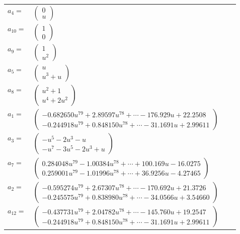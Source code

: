 \documentclass[1p]{elsarticle_modified}
\theoremstyle{definition}
\begin{document}
\begin{tabular}{m{7pt} m{180pt} m{7pt} m{180pt} }
\flushright $a_{4}=$&$\begin{pmatrix}0\\u\end{pmatrix}$ \\
\flushright $a_{10}=$&$\begin{pmatrix}1\\0\end{pmatrix}$ \\
\flushright $a_{9}=$&$\begin{pmatrix}1\\u^2\end{pmatrix}$ \\
\flushright $a_{5}=$&$\begin{pmatrix}u\\u^3+u\end{pmatrix}$ \\
\flushright $a_{8}=$&$\begin{pmatrix}u^2+1\\u^4+2 u^2\end{pmatrix}$ \\
\flushright $a_{1}=$&$\begin{pmatrix}-0.682650 u^{79}+2.89597 u^{78}+\cdots-176.929 u+22.2508\\-0.244918 u^{79}+0.848150 u^{78}+\cdots-31.1691 u+2.99611\end{pmatrix}$ \\
\flushright $a_{3}=$&$\begin{pmatrix}- u^5-2 u^3- u\\- u^7-3 u^5-2 u^3+u\end{pmatrix}$ \\
\flushright $a_{7}=$&$\begin{pmatrix}0.284048 u^{79}-1.00384 u^{78}+\cdots+100.169 u-16.0275\\0.259001 u^{79}-1.01996 u^{78}+\cdots+36.9256 u-4.27465\end{pmatrix}$ \\
\flushright $a_{2}=$&$\begin{pmatrix}-0.595274 u^{79}+2.67307 u^{78}+\cdots-170.692 u+21.3726\\-0.245575 u^{79}+0.838980 u^{78}+\cdots-34.0566 u+3.54660\end{pmatrix}$ \\
\flushright $a_{12}=$&$\begin{pmatrix}-0.437731 u^{79}+2.04782 u^{78}+\cdots-145.760 u+19.2547\\-0.244918 u^{79}+0.848150 u^{78}+\cdots-31.1691 u+2.99611\end{pmatrix}$ \\

\end{tabular}
\end{document}
